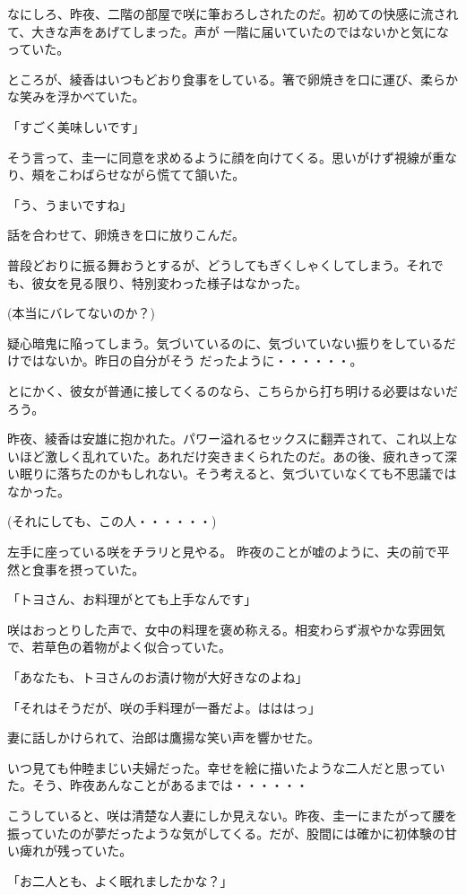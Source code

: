 ﻿\documentclass[book,tate]{jlreq}
\begin{document}
なにしろ、昨夜、二階の部屋で咲に筆おろしされたのだ。初めての快感に流されて、大きな声をあげてしまった。声が 一階に届いていたのではないかと気になっていた。

ところが、綾香はいつもどおり食事をしている。箸で卵焼きを口に運び、柔らかな笑みを浮かべていた。

「すごく美味しいです」

そう言って、圭一に同意を求めるように顔を向けてくる。思いがけず視線が重なり、頰をこわばらせながら慌てて頷いた。

「う、うまいですね」

話を合わせて、卵焼きを口に放りこんだ。

普段どおりに振る舞おうとするが、どうしてもぎくしゃくしてしまう。それでも、彼女を見る限り、特別変わった様子はなかった。

(本当にバレてないのか？)

疑心暗鬼に陥ってしまう。気づいているのに、気づいていない振りをしているだけではないか。昨日の自分がそう だったように・・・・・・。

とにかく、彼女が普通に接してくるのなら、こちらから打ち明ける必要はないだろう。

昨夜、綾香は安雄に抱かれた。パワー溢れるセックスに翻弄されて、これ以上ないほど激しく乱れていた。あれだけ突きまくられたのだ。あの後、疲れきって深い眠りに落ちたのかもしれない。そう考えると、気づいていなくても不思議ではなかった。

(それにしても、この人・・・・・・)

左手に座っている咲をチラリと見やる。 昨夜のことが嘘のように、夫の前で平然と食事を摂っていた。

「トヨさん、お料理がとても上手なんです」

咲はおっとりした声で、女中の料理を褒め称える。相変わらず淑やかな雰囲気で、若草色の着物がよく似合っていた。

「あなたも、トヨさんのお漬け物が大好きなのよね」

「それはそうだが、咲の手料理が一番だよ。はははっ」

妻に話しかけられて、治郎は鷹揚な笑い声を響かせた。

いつ見ても仲睦まじい夫婦だった。幸せを絵に描いたような二人だと思っていた。そう、昨夜あんなことがあるまでは・・・・・・

こうしていると、咲は清楚な人妻にしか見えない。昨夜、圭一にまたがって腰を振っていたのが夢だったような気がしてくる。だが、股間には確かに初体験の甘い痺れが残っていた。

「お二人とも、よく眠れましたかな？」
\end{document}
